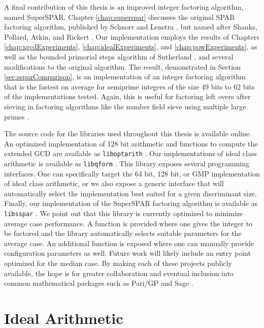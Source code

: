 \documentclass{ucalgthes1}
\theoremstyle{definition}
\begin{document}
A final contribution of this thesis is an improved integer factoring algorithm, named \mbox{SuperSPAR}.  Chapter \ref{chap:superspar} discusses the original SPAR factoring algorithm, published by Schnorr and Lenstra \cite{Schnorr1984}, but named after Shanks, Pollard, Atkin, and Rickert \cite[p.484]{Lenstra1992}.  Our implementation employs the results of Chapters \ref{chap:xgcdExperiments}, \ref{chap:idealExperiments}, and \ref{chap:powExperiments}, as well as the bounded primorial steps algorithm of Sutherland \cite{Sutherland2007}, and several modifications to the original algorithm.  The result, demonstrated in Section \ref{sec:ssparComparison}, is an implementation of an integer factoring algorithm that is the fastest on average for semiprime integers of the size 49 bits to 62 bits of the implementations tested.  Again, this is useful for factoring left overs after sieving in factoring algorithms like the number field sieve using multiple large primes \cite[\S 6.1.4]{Crandall2001}.

The source code for the libraries used throughout this thesis is available online.  An optimized implementation of 128 bit arithmetic and functions to compute the extended GCD are available as \texttt{liboptarith} \cite{liboptarith}.  Our implementations of ideal class arithmetic is available as \texttt{libqform} \cite{libqform}.  This library exposes several programming interfaces.  One can specifically target the 64 bit, 128 bit, or GMP implementation of ideal class arithmetic, or we also expose a generic interface that will automatically select the implementation best suited for a given discriminant size.  Finally, our implementation of the SuperSPAR factoring algorithm is available as \texttt{libsspar} \cite{libsspar}.  We point out that this library is currently optimized to minimize average case performance.  A function is provided where one gives the integer to be factored and the library automatically selects suitable parameters for the average case.  An additional function is exposed where one can manually provide configuration parameters as well.  Future work will likely include an entry point optimized for the median case.   By making each of these projects publicly available, the hope is for greater collaboration and eventual inclusion into common mathematical packages such as Pari/GP \cite{PariGP} and Sage \cite{Sage}.



\chapter{Ideal Arithmetic}
\label{chap:idealArithmetic}
\end{document}
